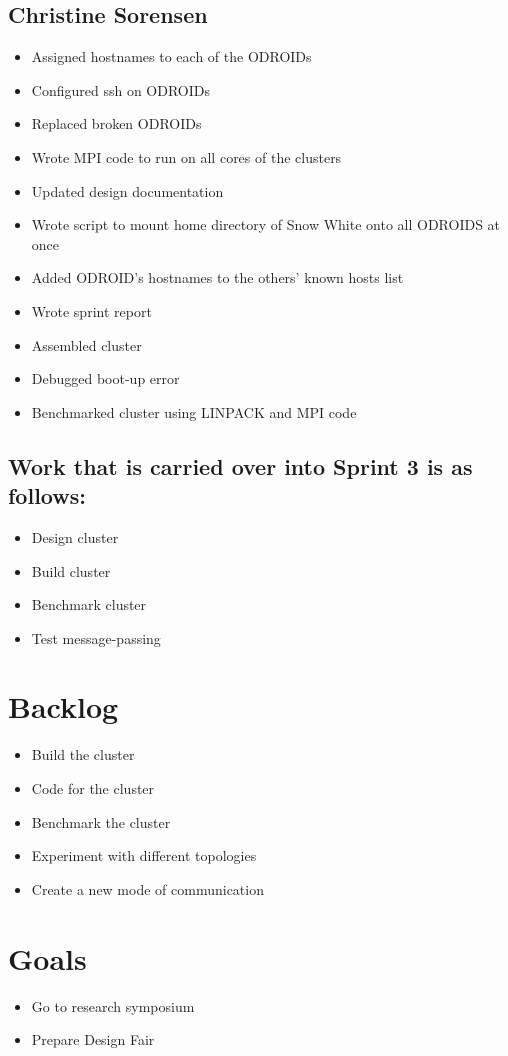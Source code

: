 \documentclass{article}
\begin{document}
\subsection*{Christine Sorensen}
\begin{itemize}
	\item Assigned hostnames to each of the ODROIDs
	\item Configured ssh on ODROIDs
	\item Replaced broken ODROIDs
	\item Wrote MPI code to run on all cores of the clusters
	\item Updated design documentation
	\item Wrote script to mount home directory of Snow White onto all ODROIDS at once
	\item Added ODROID's hostnames to the others' known hosts list
	\item Wrote sprint report 
	\item Assembled cluster
	\item Debugged boot-up error
	\item Benchmarked cluster using LINPACK and MPI code
\end{itemize}

\subsection*{Work that is carried over into Sprint 3 is as follows:}
\begin{itemize}
	\item Design cluster
	\item Build cluster
	\item Benchmark cluster
	\item Test message-passing
\end{itemize}

\section*{Backlog}
\begin{itemize}
	\item Build the cluster
	\item Code for the cluster
	\item Benchmark the cluster
	\item Experiment with different topologies
	\item Create a new mode of communication
\end{itemize}

\section*{Goals}
\begin{itemize}
	\item Go to research symposium
	\item Prepare Design Fair
\end{itemize}
\end{document}
